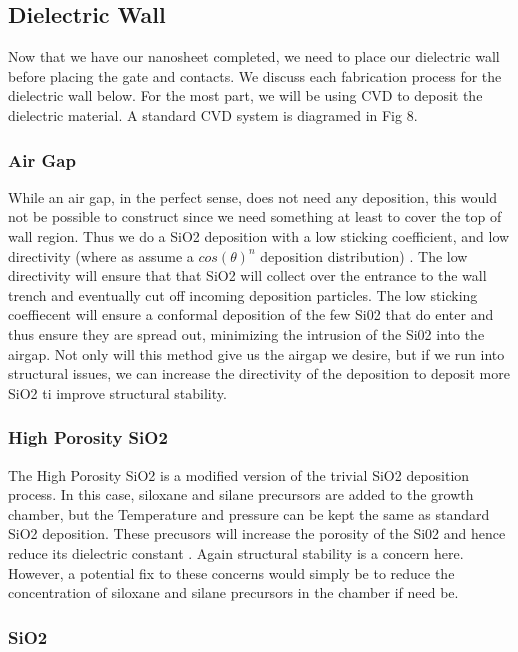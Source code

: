 \documentclass[letterpaper, 12 pt, conference]{ieeeconf}  %
\begin{document}
\subsection{Dielectric Wall}

Now that we have our nanosheet completed, we need to place our dielectric wall before placing the gate and contacts. We discuss each fabrication process for the dielectric wall below. For the most part, we will be using CVD to deposit the dielectric material. A standard CVD system is diagramed in Fig 8.

\subsubsection{Air Gap}

While an air gap, in the perfect sense, does not need any deposition, this would not be possible to construct since we need something at least to cover the top of wall region. Thus we do a SiO2 deposition with a low sticking coefficient, and low directivity (where as assume a $cos(\theta)^n$ deposition distribution) \cite{c14}. The low directivity will ensure that that SiO2 will collect over the entrance to the wall trench and eventually cut off incoming deposition particles. The low sticking coeffiecent will ensure a conformal deposition of the few Si02 that do enter and thus ensure they are spread out, minimizing the intrusion of the Si02 into the airgap. Not only will this method give us the airgap we desire, but if we run into structural issues, we can increase the directivity of the deposition to deposit more SiO2 ti improve structural stability. 

\subsubsection{High Porosity SiO2}

The High Porosity SiO2 is a modified version of the trivial SiO2 deposition process. In this case, siloxane and silane precursors are added to the growth chamber, but the Temperature and pressure can be kept the same as standard SiO2 deposition. These precusors will increase the porosity of the Si02 and hence reduce its dielectric constant \cite{c15}. Again structural stability is a concern here. However, a potential fix to these concerns would simply be to reduce the concentration of siloxane and silane precursors in the chamber if need be. 

\subsubsection{SiO2}
\end{document}
